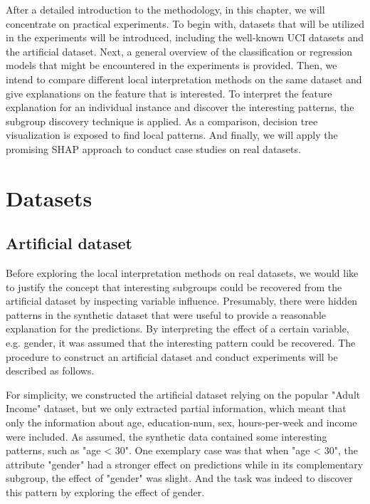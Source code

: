 After a detailed introduction to the methodology, in this chapter, we will concentrate on practical experiments. To begin with, datasets that will be utilized in the experiments will be introduced, including the well-known UCI datasets and the artificial dataset. Next, a general overview of the classification or regression models that might be encountered in the experiments is provided. Then, we intend to compare different local interpretation methods on the same dataset and give explanations on the feature that is interested. To interpret the feature explanation for an individual instance and discover the interesting patterns, the subgroup discovery technique is applied. As a comparison, decision tree visualization is exposed to find local patterns. And finally, we will apply the promising SHAP approach to conduct case studies on real datasets. 

\section{Datasets}


\subsection{Artificial dataset}

Before exploring the local interpretation methods on real datasets, we would like to justify the concept that interesting subgroups could be recovered from the artificial dataset by inspecting variable influence. Presumably, there were hidden patterns in the synthetic dataset that were useful to provide a reasonable explanation for the predictions. By interpreting the effect of a certain variable, e.g. gender, it was assumed that the interesting pattern could be recovered. The procedure to construct an artificial dataset and conduct experiments will be described as follows. 

For simplicity, we constructed the artificial dataset relying on the popular "Adult Income" dataset, but we only extracted partial information, which meant that only the information about age, education-num, sex, hours-per-week and income were included. As assumed, the synthetic data contained some interesting patterns, such as "age < 30". One exemplary case was that when "age < 30", the attribute "gender" had a stronger effect on predictions while in its complementary subgroup, the effect of "gender" was slight. And the task was indeed to discover this pattern by exploring the effect of gender. 


